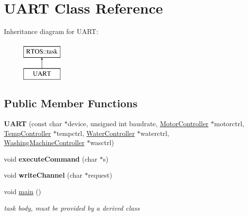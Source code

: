 \hypertarget{class_u_a_r_t}{}\section{U\+A\+RT Class Reference}
\label{class_u_a_r_t}
Inheritance diagram for U\+A\+RT\+:\begin{figure}[H]
\begin{center}
\leavevmode
\includegraphics[height=2.000000cm]{class_u_a_r_t}
\end{center}
\end{figure}
\subsection*{Public Member Functions}
\begin{DoxyCompactItemize}
\item 
{\bfseries U\+A\+RT} (const char $\ast$device, unsigned int baudrate, \hyperlink{class_motor_controller}{Motor\+Controller} $\ast$motorctrl, \hyperlink{class_temp_controller}{Temp\+Controller} $\ast$tempctrl, \hyperlink{class_water_controller}{Water\+Controller} $\ast$waterctrl, \hyperlink{class_washing_machine_controller}{Washing\+Machine\+Controller} $\ast$wasctrl)\hypertarget{class_u_a_r_t_a973d29310f6f516b29cc12c68d77b00b}{}\label{class_u_a_r_t_a973d29310f6f516b29cc12c68d77b00b}

\item 
void {\bfseries execute\+Command} (char $\ast$s)\hypertarget{class_u_a_r_t_ae8c21c98efeda377a0c881e312f920ca}{}\label{class_u_a_r_t_ae8c21c98efeda377a0c881e312f920ca}

\item 
void {\bfseries write\+Channel} (char $\ast$request)\hypertarget{class_u_a_r_t_aa5eb2b1507904d52e63b808621db32ea}{}\label{class_u_a_r_t_aa5eb2b1507904d52e63b808621db32ea}

\item 
void \hyperlink{class_u_a_r_t_a1152951cf37d51a378dc1bb25d36a37d}{main} ()
\begin{DoxyCompactList}\small\item\em task body, must be provided by a derived class \end{DoxyCompactList}\end{DoxyCompactItemize}
